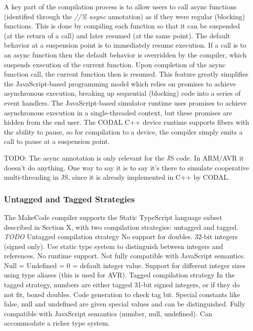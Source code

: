 A key part of the compilation process is to allow users to call async functions (identified through
the \emph{//\% async} annotation) as if they were regular (blocking) functions.  This is done by
compiling each function so that it can be suspended (at the return of a call) and later resumed (at the same point). 
The default behavior at a suspension point is to immediately resume execution.  If a call is to an async function then
the default behavior is overridden by the compiler, which suspends execution of the current function. Upon completion
of the async function call, the current function then is resumed.    This feature greatly simplifies the JavaScript-based
programming model which relies on promises to achieve asynchronous execution, breaking up sequential (blocking) code into
a series of event handlers.  The JavaScript-based simulator runtime uses promises to achieve asynchronous execution in a
single-threaded context, but these promises are hidden from the end user.    The CODAL C++ device runtime supports fibers
with the ability to pause, so for compilation to a device, the compiler simply emits a call to pause at a suspension point. 

TODO: The async annotation is only relevant for the JS code. In ARM/AVR it doesn't do anything.
One way to say it is to say it's there to simulate cooperative multi-threading in JS, since
it is already implemented in C++ by CODAL.

\subsubsection{Untagged and Tagged Strategies}

The MakeCode compiler supports the Static TypeScript language subset described in Section X, with two compilation
strategies: untagged and tagged. 
\emph{TODO}
Untagged compilation strategy
No support for doubles. 32-bit integers (signed only). Use static type system to distinguish between integers and references.
No runtime support.  Not fully compatible with JavaScript semantics. Null = Undefined = 0 = default integer value.  Support for
different integer sizes using type aliases (this is used for AVR). 
Tagged compilation strategy
In the tagged strategy, numbers are either tagged 31-bit signed integers, or if they do not fit, boxed doubles. Code generation
to check tag bit. Special constants like false, null and undefined are given special values and can be distinguished. Fully
compatible with JavaScript semantics (number, null, undefined).   Can accommodate a richer type system. 

